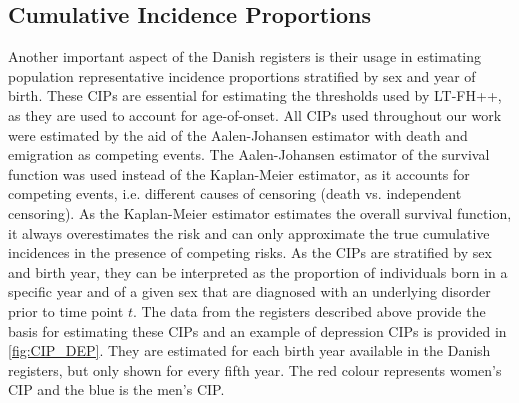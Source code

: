 \subsection{Cumulative Incidence Proportions} \label{sec:CIPs}
Another important aspect of the Danish registers is their usage in estimating population representative incidence proportions stratified by sex and year of birth. These CIPs are essential for estimating the thresholds used by LT-FH++, as they are used to account for age-of-onset. All CIPs used throughout our work were estimated by the aid of the Aalen-Johansen estimator with death and emigration as competing events\cite{andersen2012statistical,hansen2017estimating}. 
The Aalen-Johansen estimator of the survival function was used instead of the Kaplan-Meier estimator, as it accounts for competing events, i.e. different causes of censoring (death vs. independent censoring). As the Kaplan-Meier estimator estimates the overall survival function, it always overestimates the risk and can only approximate the true cumulative incidences in the presence of competing risks\cite{andersen2012competing}. As the CIPs are stratified by sex and birth year, they can be interpreted as the proportion of individuals born in a specific year and of a given sex that are diagnosed with an underlying disorder prior to time point $ t $. The data from the registers described above provide the basis for estimating these CIPs and an example of depression CIPs is provided in \cref{fig:CIP_DEP}. They are estimated for each birth year available in the Danish registers, but only shown for every fifth year. The red colour represents women's CIP and the blue is the men's CIP.


